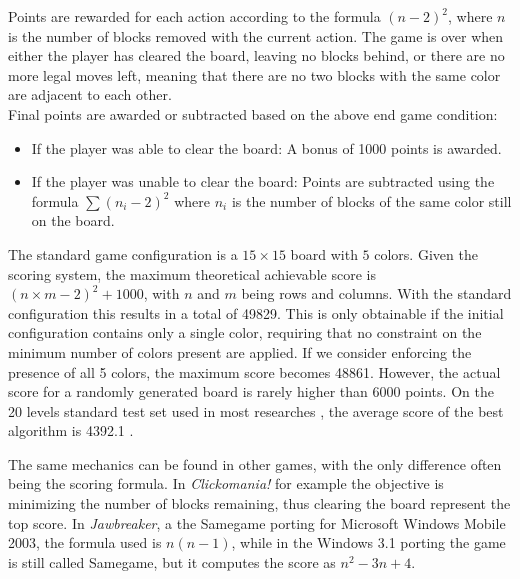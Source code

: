 \medskip\noindent
Points are rewarded for each action according to the formula $(n-2)^2$, where $n$ is the number of blocks removed with the current action. The game is over when either the player has cleared the board, leaving no blocks behind, or there are no more legal moves left, meaning that there are no two blocks with the same color are adjacent to each other.\\
Final points are awarded or subtracted based on the above end game condition: 
\begin{itemize}
    \item If the player was able to clear the board: A bonus of 1000 points is awarded.
    \item If the player was unable to clear the board: Points are subtracted using the formula $\sum{(n_i-2)^2}$ where $n_i$ is the number of blocks of the same color still on the board.
\end{itemize}
The standard game configuration is a $15\times 15$ board with $5$ colors. Given the scoring system, the maximum theoretical achievable score is $(n\times m-2)^2 +1000$, with $n$ and $m$ being rows and columns. With the standard configuration this results in a total of 49829. This is only obtainable if the initial configuration contains only a single color, requiring that no constraint on the minimum number of colors present are applied. If we consider enforcing the presence of all 5 colors, the maximum score becomes 48861. However, the actual score for a randomly generated board is rarely higher than 6000 points. On the 20 levels standard test set used in most researches \cite{DBLP:journals/kbs/SchaddWTU12} \cite{Cazenave2009} \cite{IJCAI113358}, the average score of the best algorithm is 4392.1 \cite{highscore}.

\medskip\noindent
The same mechanics can be found in other games, with the only difference often being the scoring formula. In \textit{Clickomania!} for example the objective is minimizing the number of blocks remaining, thus clearing the board represent the top score. In \textit{Jawbreaker}, a the Samegame porting for Microsoft Windows Mobile 2003, the formula used is $n(n-1)$, while in the Windows 3.1 porting the game is still called Samegame, but it computes the score as $n^2-3n+4$.

